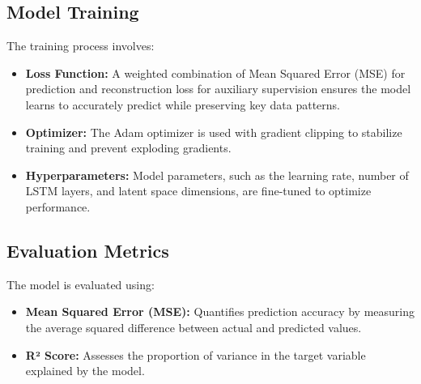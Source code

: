 \subsection{Model Training}
The training process involves:
\begin{itemize}
    \item \textbf{Loss Function:} A weighted combination of Mean Squared Error (MSE) for prediction and reconstruction loss for auxiliary supervision ensures the model learns to accurately predict while preserving key data patterns.
    \item \textbf{Optimizer:} The Adam optimizer is used with gradient clipping to stabilize training and prevent exploding gradients.
    \item \textbf{Hyperparameters:} Model parameters, such as the learning rate, number of LSTM layers, and latent space dimensions, are fine-tuned to optimize performance.
\end{itemize}

\subsection{Evaluation Metrics}
The model is evaluated using:
\begin{itemize}
    \item \textbf{Mean Squared Error (MSE):} Quantifies prediction accuracy by measuring the average squared difference between actual and predicted values.
    \item \textbf{R² Score:} Assesses the proportion of variance in the target variable explained by the model.
\end{itemize}

